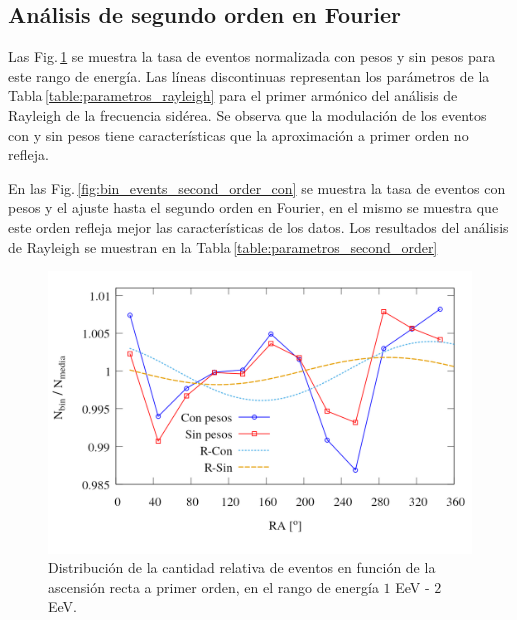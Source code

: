 \subsection{Análisis de segundo orden en Fourier}
Las Fig.\,\ref{fig:bin_events_first_order} se muestra la tasa de eventos normalizada con pesos y sin pesos para este rango de energía. Las líneas discontinuas representan los parámetros de la Tabla\,\ref{table:parametros_rayleigh} para el primer armónico del análisis de Rayleigh de la frecuencia sidérea. Se observa que la modulación de los eventos con y sin pesos tiene características que la aproximación a primer orden no refleja. 	


	En las Fig.\,\ref{fig:bin_events_second_order_con} se muestra la tasa de eventos con pesos y el ajuste hasta el segundo orden en Fourier, en el mismo se muestra que este orden refleja mejor las características de los datos. Los resultados del análisis de Rayleigh  se muestran en la Tabla\,\ref{table:parametros_second_order}

	\begin{figure}[H]
		\centering
		\includegraphics[width=0.7\linewidth]{eventos_clasificados_por_RA_v4.png}
		\vspace*{-0.9 cm}
		\caption{Distribución de la cantidad relativa de eventos en función de la ascensión recta a primer orden, en el rango de energía $1$ EeV - $2$ EeV.}
		\label{fig:bin_events_first_order}
	\end{figure}
	
